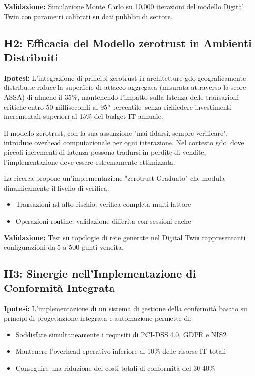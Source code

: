 \textbf{Validazione:} Simulazione Monte Carlo su 10.000 iterazioni del modello Digital Twin con parametri calibrati su dati pubblici di settore.

\subsection{\texorpdfstring{H2: Efficacia del Modello \gls{zerotrust} in Ambienti Distribuiti}{1.4.2 - H2: Efficacia del Modello Zero Trust in Ambienti Distribuiti}}
\label{subsec:h2}

\textbf{Ipotesi:} L'integrazione di principi \gls{zerotrust} in architetture \gls{gdo} geograficamente distribuite riduce la superficie di attacco aggregata (misurata attraverso lo score ASSA) di almeno il 35\%, mantenendo l'impatto sulla latenza delle transazioni critiche entro 50 millisecondi al 95° percentile, senza richiedere investimenti incrementali superiori al 15\% del budget IT annuale.

Il modello \gls{zerotrust}, con la sua assunzione "mai fidarsi, sempre verificare", introduce overhead computazionale per ogni interazione. Nel contesto \gls{gdo}, dove piccoli incrementi di latenza possono tradursi in perdite di vendite, l'implementazione deve essere estremamente ottimizzata.

La ricerca propone un'implementazione "\gls{zerotrust} Graduato" che modula dinamicamente il livello di verifica:
\begin{itemize}
\item Transazioni ad alto rischio: verifica completa multi-fattore
\item Operazioni routine: validazione differita con sessioni cache
\end{itemize}

\textbf{Validazione:} Test su topologie di rete generate nel Digital Twin rappresentanti configurazioni da 5 a 500 punti vendita.

\subsection{\texorpdfstring{H3: Sinergie nell'Implementazione di Conformità Integrata}{1.4.3 - H3: Sinergie nell'Implementazione di Conformità Integrata}}
\label{subsec:h3}

\textbf{Ipotesi:} L'implementazione di un sistema di gestione della conformità basato su principi di progettazione integrata e automazione permette di:
\begin{itemize}
\item Soddisfare simultaneamente i requisiti di PCI-DSS 4.0, GDPR e NIS2
\item Mantenere l'overhead operativo inferiore al 10\% delle risorse IT totali
\item Conseguire una riduzione dei costi totali di conformità del 30-40\%
\end{itemize}

